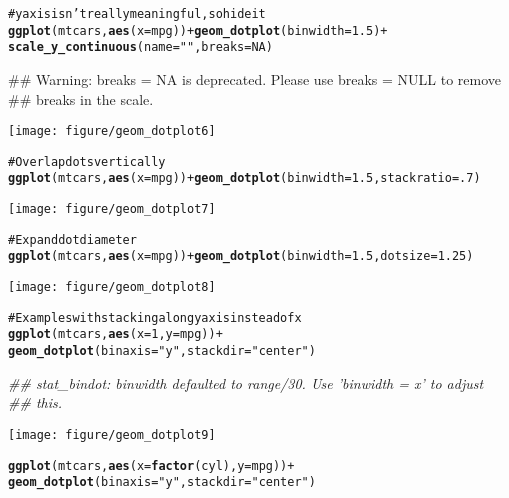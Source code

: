 \documentclass[a4paper,titlepage]{tufte-handout}\usepackage{graphicx, color}
\makeatletter
\def\maxwidth{ %
  \ifdim\Gin@nat@width>\linewidth
    \linewidth
  \else
    \Gin@nat@width
  \fi
}
\newcommand{\hlfunctioncall}[1]{\textcolor[rgb]{0.501960784313725,0,0.329411764705882}{\textbf{#1}}}%
\newcommand{\hlstring}[1]{\textcolor[rgb]{0.6,0.6,1}{#1}}%
\newcommand{\hlcomment}[1]{\textcolor[rgb]{0.180392156862745,0.6,0.341176470588235}{#1}}%
\newenvironment{kframe}{%
 \def\at@end@of@kframe{}%
 \ifinner\ifhmode%
  \def\at@end@of@kframe{\end{minipage}}%
  \begin{minipage}{\columnwidth}%
 \fi\fi%
 \def\FrameCommand##1{\hskip\@totalleftmargin \hskip-\fboxsep
 \colorbox{shadecolor}{##1}\hskip-\fboxsep
     \hskip-\linewidth \hskip-\@totalleftmargin \hskip\columnwidth}%
 \MakeFramed {\advance\hsize-\width
   \@totalleftmargin\z@ \linewidth\hsize
   \@setminipage}}%
 {\par\unskip\endMakeFramed%
 \at@end@of@kframe}
\newenvironment{knitrout}{}{} %
\makeatother
\begin{document}
\begin{knitrout}
\begin{kframe}
\begin{alltt}
\hlcomment{# y axis isn't really meaningful, so hide it}
\hlfunctioncall{ggplot}(mtcars, \hlfunctioncall{aes}(x = mpg)) + \hlfunctioncall{geom_dotplot}(binwidth = 1.5) +
  \hlfunctioncall{scale_y_continuous}(name = \hlstring{""}, breaks = NA)
\end{alltt}
\begin{flushleft}\ttfamily\noindent\textcolor{warningcolor}{\#\# Warning: breaks = NA is deprecated. Please use breaks = NULL to remove \\ 
\#\# breaks in the scale.}\end{flushleft}\end{kframe}\texttt{[image: figure/geom\_dotplot6]} \begin{kframe}\begin{alltt}
\hlcomment{# Overlap dots vertically}
\hlfunctioncall{ggplot}(mtcars, \hlfunctioncall{aes}(x = mpg)) + \hlfunctioncall{geom_dotplot}(binwidth = 1.5, stackratio = .7)
\end{alltt}
\end{kframe}\texttt{[image: figure/geom\_dotplot7]} \begin{kframe}\begin{alltt}
\hlcomment{# Expand dot diameter}
\hlfunctioncall{ggplot}(mtcars, \hlfunctioncall{aes}(x  =mpg)) + \hlfunctioncall{geom_dotplot}(binwidth = 1.5, dotsize = 1.25)
\end{alltt}
\end{kframe}\texttt{[image: figure/geom\_dotplot8]} \begin{kframe}\begin{alltt}
\hlcomment{# Examples with stacking along y axis instead of x}
\hlfunctioncall{ggplot}(mtcars, \hlfunctioncall{aes}(x = 1, y = mpg)) +
  \hlfunctioncall{geom_dotplot}(binaxis = \hlstring{"y"}, stackdir = \hlstring{"center"})
\end{alltt}
\begin{flushleft}\ttfamily\noindent\itshape\textcolor{messagecolor}{\#\# stat\_bindot: binwidth defaulted to range/30. Use 'binwidth = x' to adjust \\ 
\#\# this.}\end{flushleft}\end{kframe}\texttt{[image: figure/geom\_dotplot9]} \begin{kframe}\begin{alltt}
\hlfunctioncall{ggplot}(mtcars, \hlfunctioncall{aes}(x = \hlfunctioncall{factor}(cyl), y = mpg)) +
  \hlfunctioncall{geom_dotplot}(binaxis = \hlstring{"y"}, stackdir = \hlstring{"center"})

\end{alltt}
\end{kframe}
\end{knitrout}
\end{document}
